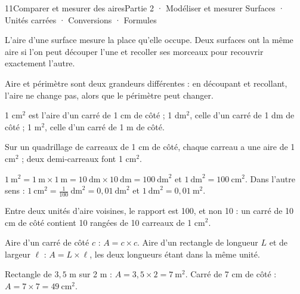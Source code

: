 \begin{ouverture}[grandeurs]{11}{Comparer et mesurer des aires}{Partie 2 · Modéliser et mesurer}
{Surfaces · Unités carrées · Conversions · Formules}
\end{ouverture}
\pagestyle{otMain}\essentiel\fontsize{11}{15}\selectfont
{}\label{cours-11-1}
\begin{definition}L’aire d’une surface mesure la place qu’elle occupe. Deux surfaces ont la même aire si l’on peut découper l’une et recoller ses morceaux pour recouvrir exactement l’autre.\end{definition}
\label{fig-cours-11-1-cours-decoupage}

\begin{attention}Aire et périmètre sont deux grandeurs différentes : en découpant et recollant, l’aire ne change pas, alors que le périmètre peut changer.\end{attention}
\begin{definition}1 cm$^2$ est l’aire d’un carré de 1 cm de côté ; 1 dm$^2$, celle d’un carré de 1 dm de côté ; 1 m$^2$, celle d’un carré de 1 m de côté.\end{definition}
\begin{savoirfaire}Sur un quadrillage de carreaux de 1 cm de côté, chaque carreau a une aire de 1 cm$^2$ ; deux demi-carreaux font 1 cm$^2$.\end{savoirfaire}
\clearpage
{}\label{cours-11-2}
\begin{propriete}$1\ \mathrm{m}^2=1\ \mathrm m\times1\ \mathrm m=10\ \mathrm{dm}\times10\ \mathrm{dm}=100\ \mathrm{dm}^2$ et $1\ \mathrm{dm}^2=100\ \mathrm{cm}^2$. Dans l’autre sens : $1\ \mathrm{cm}^2=\frac1{100}\ \mathrm{dm}^2=0{,}01\ \mathrm{dm}^2$ et $1\ \mathrm{dm}^2=0{,}01\ \mathrm{m}^2$.\end{propriete}
\label{fig-cours-11-2-cours-dm2}

\begin{attention}Entre deux unités d’aire voisines, le rapport est 100, et non 10 : un carré de 10 cm de côté contient 10 rangées de 10 carreaux de 1 cm$^2$.\end{attention}
\begin{propriete}Aire d’un carré de côté $c$ : $A=c\times c$. Aire d’un rectangle de longueur $L$ et de largeur $\ell$ : $A=L\times\ell$, les deux longueurs étant dans la même unité.\end{propriete}
\begin{exemple}Rectangle de $3{,}5$ m sur 2 m : $A=3{,}5\times2=7\ \mathrm{m}^2$. Carré de 7 cm de côté : $A=7\times7=49\ \mathrm{cm}^2$.\end{exemple}

